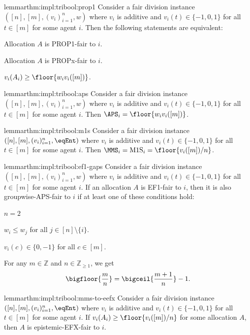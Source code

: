 \begin{restatable}{lemma}{rthm:impl:tribool:prop1}
\label{thm:impl:tribool:prop1}
Consider a fair division instance $([n], [m], (v_i)_{i=1}^n, w)$ where
$v_i$ is additive and $v_i(t) \in \{-1, 0, 1\}$ for all $t \in [m]$ for some agent $i$.
Then the following statements are equivalent:
\begin{tightenum}
\item Allocation $A$ is PROP1-fair to $i$.
\item Allocation $A$ is PROPx-fair to $i$.
\item $v_i(A_i) \ge \floor{w_iv_i([m])}$.
\end{tightenum}
\end{restatable}

\begin{restatable}{lemma}{rthm:impl:tribool:aps}
\label{thm:impl:tribool:aps}
Consider a fair division instance $([n], [m], (v_i)_{i=1}^n, w)$ where
$v_i$ is additive and $v_i(t) \in \{-1, 0, 1\}$ for all $t \in [m]$ for some agent $i$.
Then $\APS_i = \floor{w_iv_i([m])}$.
\end{restatable}

\begin{restatable}{lemma}{rthm:impl:tribool:m1s}
\label{thm:impl:tribool:m1s}
Consider a fair division instance $([n], [m], (v_i)_{i=1}^n, \eqEnt)$
where $v_i$ is additive and $v_i(t) \in \{-1, 0, 1\}$ for all $t \in [m]$ for some agent $i$.
Then $\MMS_i = \mathrm{M1S}_i = \floor{v_i([m])/n}$.
\end{restatable}

\begin{restatable}{lemma}{rthm:impl:tribool:ef1-gaps}
\label{thm:impl:tribool:ef1-gaps}
Consider a fair division instance $([n], [m], (v_i)_{i=1}^n, w)$ where
$v_i$ is additive and $v_i(t) \in \{-1, 0, 1\}$ for all $t \in [m]$ for some agent $i$.
If an allocation $A$ is EF1-fair to $i$, then it is also groupwise-APS-fair to $i$
if at least one of these conditions hold:
\begin{tightenum}
\item $n=2$
\item $w_i \le w_j$ for all $j \in [n] \setminus \{i\}$.
\item $v_i(c) \in \{0, -1\}$ for all $c \in [m]$.
\end{tightenum}
\end{restatable}

\begin{remark}
\label{thm:ceil-floor}
For any $m \in \mathbb{Z}$ and $n \in \mathbb{Z}_{\ge 1}$, we get
\[ \bigfloor{\frac{m}{n}} = \bigceil{\frac{m+1}{n}} - 1. \]
\end{remark}

\begin{restatable}{lemma}{rthm:impl:tribool:mms-to-eefx}
\label{thm:impl:tribool:mms-to-eefx}
Consider a fair division instance $([n], [m], (v_i)_{i=1}^n, \eqEnt)$
where $v_i$ is additive and $v_i(t) \in \{-1, 0, 1\}$ for all $t \in [m]$ for some agent $i$.
If $v_i(A_i) \ge \floor{v_i([m])/n}$ for some allocation $A$,
then $A$ is epistemic-EFX-fair to $i$.
\end{restatable}
